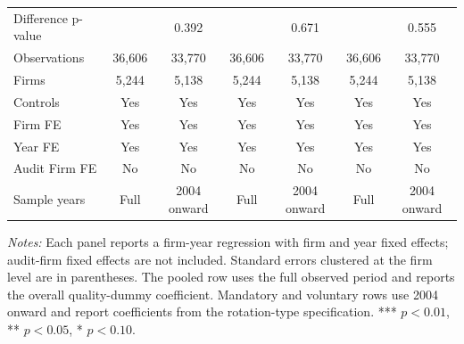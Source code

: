 \begin{table}[htbp]
\begin{threeparttable}
{\begin{tabular}{l cc cc cc}
Difference p-value &  & 0.392 &  & 0.671 &  & 0.555 \\
Observations & 36,606 & 33,770 & 36,606 & 33,770 & 36,606 & 33,770 \\
Firms & 5,244 & 5,138 & 5,244 & 5,138 & 5,244 & 5,138 \\
\midrule
Controls & Yes & Yes & Yes & Yes & Yes & Yes \\
Firm FE & Yes & Yes & Yes & Yes & Yes & Yes \\
Year FE & Yes & Yes & Yes & Yes & Yes & Yes \\
Audit Firm FE & No & No & No & No & No & No \\
Sample years & Full & 2004 onward & Full & 2004 onward & Full & 2004 onward \\
\bottomrule
\end{tabular}}
\begin{tablenotes}\footnotesize
\item \textit{Notes:} Each panel reports a firm-year regression with firm and year fixed effects; audit-firm fixed effects are not included. Standard errors clustered at the firm level are in parentheses. The pooled row uses the full observed period and reports the overall quality-dummy coefficient. Mandatory and voluntary rows use 2004 onward and report coefficients from the rotation-type specification. *** \(p<0.01\), ** \(p<0.05\), * \(p<0.10\).
\end{tablenotes}
\end{threeparttable}
\end{table}
